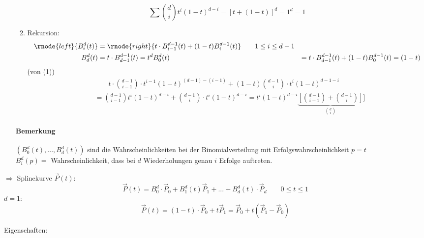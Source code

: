 \begin{itemize}
\begin{enumerate}
		\Bew	\[\sum \binom{d}{i} t^i (1-t)^{d-i} = [t + (1-t)]^d = 1^d = 1\]
	 \item Rekursion:
		\begin{align}
		\rnode{left}{B_i^d(t)} &= \rnode{right}{t \cdot B_{i-1}^{d-1}(t) + (1-t)B_i^{d-1}(t)} \qquad 1 \le i \le d - 1\\
		 B_d^d(t) &= t \cdot B_{d-1}^{d-1}(t)	= t^d
		 B_0^d(t) &= t \cdot B_{d-1}^{d-1}(t) + (1-t) B_0^{d-1}(t) = (1-t)
		\end{align}
		\Bew (von (1))
			\begin{align*}
			 & \qquad t \cdot \binom{d-1}{i-1} \cdot t^{i-1} (1-t)^{(d-1)-(i-1)} + (1-t) \binom{d-1}{i} \cdot
				t^{i} (1-t)^{d-1-i}\\
			 &= \binom{d-1}{i-1}t^i (1-t)^{d-i} + \binom{d-1}{i} \cdot t^i (1-t)^{d-i}
				= t^i (1-t)^{d-i} \underbrace{\left[\binom{d-1}{i-1}+ \binom{d-1}{i}\right]}_{\binom{d}{i}}]
			\end{align*}
	\end{enumerate}
	\paragraph*{Bemerkung} $(B_0^d(t), ..., B_d^d(t))$ sind die Wahrscheinlichkeiten bei der Binomialverteilung mit
	Erfolgswahrscheinlichkeit $p = t$\\[1em]
	$B_i^d(p) =$ Wahrscheinlichkeit, dass bei $d$ Wiederholungen genau $i$ Erfolge auftreten.
\end{itemize}
$\Rightarrow$ Splinekurve $\vec P(t)$:
\[
 \boxed{\vec P(t) = B_0^d \cdot \vec P_0 + B_1^d(t) \vec P_1 + ... + B_d^d(t) \cdot \vec P_d} \qquad 0 \le t \le 1
\]
$d = 1$:
\[\vec P(t) = (1-t) \cdot \vec P_0 + t \vec P_1 = \vec P_0 + t(\vec P_1 - \vec P_0)\]
\begin{center}
\end{center}
Eigenschaften:
